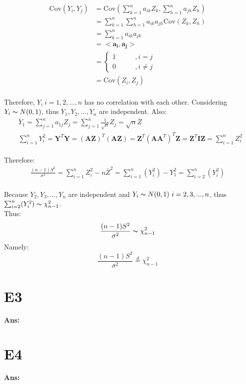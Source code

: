 \documentclass[twoside]{homework}
\begin{document}
\begin{equation}
    \begin{aligned}
    \mathrm{Cov}(Y_i, Y_j) &= \mathrm{Cov}(\sum_{k=1}^{n} a_{ik}Z_k, \sum_{h=1}^{n} a_{jh}Z_h) \\
    &= \sum_{k=1}^{n} \sum_{h=1}^{n} a_{ik} a_{jh} \mathrm{Cov}(Z_k, Z_h) \\
    &= \sum_{k=1}^{n} a_{ik} a_{jk}\\
    &= <\bm{a_i}, \bm{a_j}>\\
    &=
    \left\{  
             \begin{aligned}
             1\qquad&, i=j \\
             0\qquad&, i\neq j
             \end{aligned}
    \right. \\
    &= \mathrm{Cov}(Z_i, Z_j)
    \end{aligned}
\end{equation}\\
Therefore, $Y_i\ i=1,2,...,n$ has no correlation with each other. Considering $Y_i \thicksim N(0,1)$, thus $Y_1, Y_2,..., Y_n$ are independent. 
Also:\\
\begin{equation}
\begin{aligned}
&Y_1 = \sum_{j=1}^{n} a_{1j}Z_j = \sum_{j=1}^{n}\frac{1}{\sqrt{n}}Z_j = \sqrt{n}\bar{Z}\\
&\sum_{i=1}^{n}Y_i^2 = \bm{Y}^T\bm{Y} = (\bm{AZ})^T(\bm{AZ}) = \bm{Z}^T (\bm{A} \bm{A}^T)^T \bm{Z} = \bm{Z}^T \bm{I} \bm{Z} = \sum_{i=1}^{n}Z_i^2
\end{aligned}
\end{equation}\\
Therefore:
\begin{equation}
\begin{aligned}
\frac{(n-1)S^2}{\sigma^2} = \sum_{i=1}^{n}Z_i^2 - n\bar{Z}^2 = \sum_{i=1}^{n}(Y_i^2) - Y_1^2 = \sum_{i=2}^{n}(Y_i^2)
\end{aligned}
\end{equation}\\
Because $Y_2, Y_3,..., Y_n$ are independent and $Y_i \thicksim N(0,1)\ i=2,3,...,n$, thus $\sum_{i=2}^{n}(Y_i^2)\thicksim \chi_{n-1}^2$. \\
Thus:
$$\frac{(n-1)S^2}{\sigma^2}\thicksim \chi_{n-1}^2$$
Namely:
$$\frac{(n-1)S^2}{\sigma^2}\overset{d}{=} \chi_{n-1}^2$$


\newpage

\section*{E3}
\textbf{Ans:}\\


\newpage

\section*{E4}
\textbf{Ans:}\\


\newpage
\end{document}
